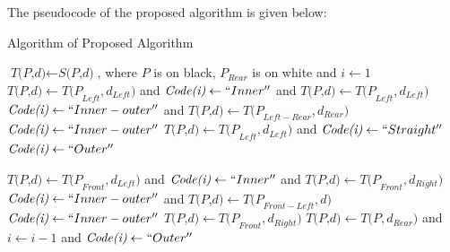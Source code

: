 
The pseudocode of the proposed algorithm is given below: 

\begin{algorithm}
	\caption{Algorithm of Proposed Algorithm}
	\label{alg:proposed}
	\begin{algorithmic}[1]
	\State $\textit{T(P,d)} \gets \textit{S(P,d)}$, where $P$ is on black, $P_{Rear}$ is on white and $i \gets 1$
	\Do
			\State $\textit{T(P,d)} \gets \textit{T(P}_{Left},\textit{d}_{Left} )  $ and $\textit{Code(i)} \gets ``Inner''$ and $\textit{T(P,d)} \gets \textit{T(P}_{Left}, \textit{d}_{Left})$
		\Else
			\State $\textit{Code(i)} \gets ``Inner-outer''$ and $\textit{T(P,d)} \gets \textit{T(P}_{Left-Rear},\textit{d}_{Rear} )  $
			\State $\textit{Code(i)} \gets ``Inner-outer''$
		\EndIf
	\Else
			\State $\textit{T(P,d)} \gets \textit{T(P}_{Left},\textit{d}_{Left} )  $ and $\textit{Code(i)} \gets ``Straight''$
		\Else
			\State $\textit{Code(i)} \gets ``Outer''$
		\EndIf
	\EndIf


			\State $\textit{T(P,d)} \gets \textit{T(P}_{Front},\textit{d}_{Left} )  $ and $\textit{Code(i)} \gets ``Inner''$ and $\textit{T(P,d)} \gets \textit{T(P}_{Front}, \textit{d}_{Right})$
		\Else
			\State $\textit{Code(i)} \gets ``Inner-outer''$ and $\textit{T(P,d)} \gets \textit{T(P}_{Front-Left},\textit{d} )  $
			\State $\textit{Code(i)} \gets ``Inner-outer''$
		\EndIf
		\State $\textit{T(P,d)} \gets \textit{T(P}_{Front},\textit{d}_{Right} )  $
	\Else
		\State $\textit{T(P,d)} \gets \textit{T(P},\textit{d}_{Rear} )  $ and $i \gets i-1$ and $\textit{Code(i)} \gets ``Outer''$
	\EndIf


	\EndProcedure
	\end{algorithmic}
\end{algorithm}


